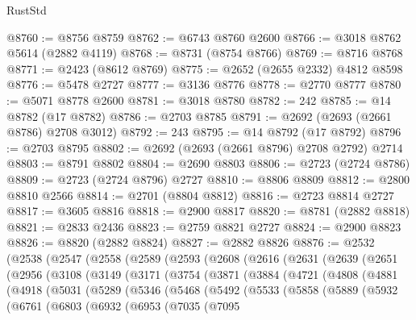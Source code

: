 \begin{lexlean}{RustStd}
\begin{coremodule}
{\begin{coremodule}
{{{{{{{{{{{{{{{{{{{{{{{{{{{{{{{{{{{{{{{@8760 := @8756 @8759
@8762 := @6743 @8760 @2600
@8766 := @3018 @8762 @5614 (@2882 @4119)
@8768 := @8731 (@8754 @8766)
@8769 := @8716 @8768
@8771 := @2423 (@8612 @8769)
@8775 := @2652 (@2655 @2332) @4812 @8598
@8776 := @5478 @2727
@8777 := @3136 @8776
@8778 := @2770 @8777
@8780 := @5071 @8778 @2600
@8781 := @3018 @8780
@8782 := 242
@8785 := @14 @8782 (@17 @8782)
@8786 := @2703 @8785
@8791 := @2692 (@2693 (@2661 @8786) @2708 @3012)
@8792 := 243
@8795 := @14 @8792 (@17 @8792)
@8796 := @2703 @8795
@8802 := @2692 (@2693 (@2661 @8796) @2708 @2792) @2714
@8803 := @8791 @8802
@8804 := @2690 @8803
@8806 := @2723 (@2724 @8786)
@8809 := @2723 (@2724 @8796) @2727
@8810 := @8806 @8809
@8812 := @2800 @8810 @2566
@8814 := @2701 (@8804 @8812)
@8816 := @2723 @8814 @2727
@8817 := @3605 @8816
@8818 := @2900 @8817
@8820 := @8781 (@2882 @8818)
@8821 := @2833 @2436
@8823 := @2759 @8821 @2727
@8824 := @2900 @8823
@8826 := @8820 (@2882 @8824)
@8827 := @2882 @8826
@8876 := @2532
    (@2538
      (@2547
        (@2558
          (@2589
            (@2593
              (@2608
                (@2616
                  (@2631
                    (@2639
                      (@2651
                        (@2956
                          (@3108
                            (@3149
                              (@3171
                                (@3754
                                  (@3871
                                    (@3884
                                      (@4721
                                        (@4808
                                          (@4881
                                            (@4918
                                              (@5031
                                                (@5289
                                                  (@5346
                                                    (@5468
                                                      (@5492
                                                        (@5533
                                                          (@5858
                                                            (@5889
                                                              (@5932
                                                                (@6761
                                                                  (@6803
                                                                    (@6932
                                                                      (@6953
                                                                        (@7035
                                                                          (@7095
}}}}}}}}}}}}}}}}}}}}}}}}}}}}}}}}}}}}}}}
\end{coremodule}}
\end{coremodule}
\end{lexlean}

